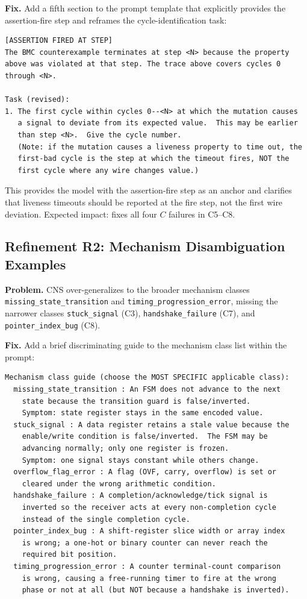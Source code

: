 \documentclass[11pt,a4paper]{article}
\begin{document}
\textbf{Fix.} Add a fifth section to the prompt template that explicitly
provides the assertion-fire step and reframes the cycle-identification task:

\begin{lstlisting}[caption={Additional prompt section for R1.}, language={}]
[ASSERTION FIRED AT STEP]
The BMC counterexample terminates at step <N> because the property
above was violated at that step. The trace above covers cycles 0
through <N>.

Task (revised):
1. The first cycle within cycles 0--<N> at which the mutation causes
   a signal to deviate from its expected value.  This may be earlier
   than step <N>.  Give the cycle number.
   (Note: if the mutation causes a liveness property to time out, the
   first-bad cycle is the step at which the timeout fires, NOT the
   first cycle where any wire changes value.)
\end{lstlisting}

\noindent This provides the model with the assertion-fire step as an anchor and
clarifies that liveness timeouts should be reported at the fire step, not the
first wire deviation. Expected impact: fixes all four $C$ failures in C5--C8.

\subsection{Refinement R2: Mechanism Disambiguation Examples}

\textbf{Problem.} CNS over-generalizes to the broader mechanism classes
\texttt{missing\_state\_transition} and \texttt{timing\_progression\_error},
missing the narrower classes \texttt{stuck\_signal} (C3),
\texttt{handshake\_failure} (C7), and \texttt{pointer\_index\_bug} (C8).

\textbf{Fix.} Add a brief discriminating guide to the mechanism class list
within the prompt:

\begin{lstlisting}[caption={Mechanism class guide for R2.}, language={}]
Mechanism class guide (choose the MOST SPECIFIC applicable class):
  missing_state_transition : An FSM does not advance to the next
    state because the transition guard is false/inverted.
    Symptom: state register stays in the same encoded value.
  stuck_signal : A data register retains a stale value because the
    enable/write condition is false/inverted.  The FSM may be
    advancing normally; only one register is frozen.
    Symptom: one signal stays constant while others change.
  overflow_flag_error : A flag (OVF, carry, overflow) is set or
    cleared under the wrong arithmetic condition.
  handshake_failure : A completion/acknowledge/tick signal is
    inverted so the receiver acts at every non-completion cycle
    instead of the single completion cycle.
  pointer_index_bug : A shift-register slice width or array index
    is wrong; a one-hot or binary counter can never reach the
    required bit position.
  timing_progression_error : A counter terminal-count comparison
    is wrong, causing a free-running timer to fire at the wrong
    phase or not at all (but NOT because a handshake is inverted).
\end{lstlisting}
\end{document}
